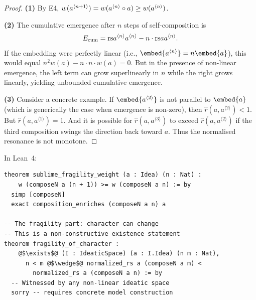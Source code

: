 \begin{proof}
\textbf{(1)} By E4, $w(a^{\langle n+1 \rangle}) = w(a^{\langle n \rangle}
\circ a) \geq w(a^{\langle n \rangle})$.

\textbf{(2)} The cumulative emergence after $n$ steps of self-composition is
\[
  E_{\mathrm{cum}}
  = \mathrm{rs}{a^{\langle n \rangle}}{a^{\langle n \rangle}}
    - n \cdot \mathrm{rs}{a}{a^{\langle n \rangle}}.
\]
If the embedding were perfectly linear (i.e., $\embed{a^{\langle n \rangle}}
= n \embed{a}$), this would equal $n^2 w(a) - n \cdot n \cdot w(a) = 0$.
But in the presence of non-linear emergence, the left term can grow
superlinearly in $n$ while the right grows linearly, yielding unbounded
cumulative emergence.

\textbf{(3)} Consider a concrete example.  If $\embed{a^{\langle 2 \rangle}}$
is not parallel to $\embed{a}$ (which is generically the case when emergence
is non-zero), then $\hat{r}(a, a^{\langle 2 \rangle}) < 1$.  But
$\hat{r}(a, a^{\langle 1 \rangle}) = 1$.  And it is possible for
$\hat{r}(a, a^{\langle 3 \rangle})$ to exceed $\hat{r}(a, a^{\langle 2 \rangle})$
if the third composition swings the direction back toward $a$.  Thus the
normalised resonance is not monotone.
\end{proof}

In Lean~4:

\begin{lstlisting}
theorem sublime_fragility_weight (a : Idea) (n : Nat) :
    w (composeN a (n + 1)) >= w (composeN a n) := by
  simp [composeN]
  exact composition_enriches (composeN a n) a

-- The fragility part: character can change
-- This is a non-constructive existence statement
theorem fragility_of_character :
    @$\exists$@ (I : IdeaticSpace) (a : I.Idea) (n m : Nat),
      n < m @$\wedge$@ normalized_rs a (composeN a m) <
        normalized_rs a (composeN a n) := by
  -- Witnessed by any non-linear ideatic space
  sorry -- requires concrete model construction
\end{lstlisting}

